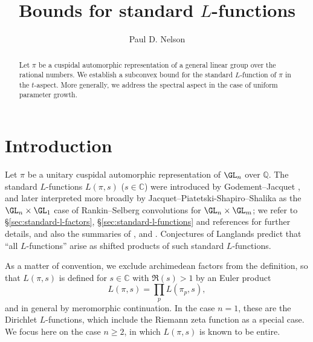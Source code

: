 \author{Paul D. Nelson}
\address{Aarhus University, Denmark}
\title{Bounds for standard $L$-functions}



\begin{abstract}
  Let $\pi$ be a cuspidal automorphic representation of a general linear group over the rational numbers.  We establish a subconvex bound for the standard $L$-function of $\pi$ in the $t$-aspect.  More generally, we address the spectral aspect in the case of uniform parameter growth.
\end{abstract}

\maketitle

\setcounter{tocdepth}{1} \tableofcontents
\section{Introduction}\label{sec:introduction}
Let $\pi$ be a unitary cuspidal automorphic representation of $\GL_n$ over $\mathbb{Q}$.  The standard $L$-functions $L(\pi,s)$ ($s \in \mathbb{C}$) were introduced by Godement--Jacquet \cite{MR0342495}, and later interpreted more broadly by Jacquet--Piatetski-Shapiro--Shalika as the $\GL_n \times \GL_1$ case of Rankin--Selberg convolutions for $\GL_n \times \GL_m$; we refer to \S\ref{sec:standard-l-factors}, \S\ref{sec:standard-l-functions} and references for further details, and also the summaries of \cite{MR546609}, \cite[\S2]{MR1395406} and \cite{MR2508768}.  Conjectures of Langlands \cite{MR0302614} predict that ``all $L$-functions'' arise as shifted products of such standard $L$-functions.

As a matter of convention, we exclude archimedean factors from the definition, so that $L(\pi,s)$ is defined for $s \in \mathbb{C}$ with $\Re(s) > 1$ \cite[I, Thm 5.3]{MR618323} by an Euler product
\begin{equation*}
  L(\pi,s) = \prod_p L(\pi_p,s),
\end{equation*}
and in general by meromorphic continuation.  In the case $n = 1$, these are the Dirichlet $L$-functions, which include the Riemann zeta function as a special case.  We focus here on the case $n \geq 2$, in which $L(\pi,s)$ is known to be entire.

